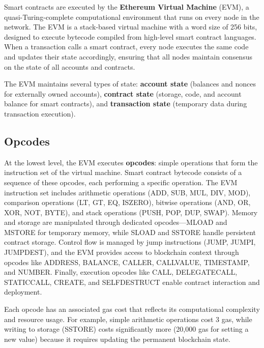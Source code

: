 Smart contracts are executed by the \textbf{Ethereum Virtual Machine} (EVM), a quasi-Turing-complete computational environment that runs on every node in the network. The EVM is a stack-based virtual machine with a word size of 256 bits, designed to execute bytecode compiled from high-level smart contract languages. When a transaction calls a smart contract, every node executes the same code and updates their state accordingly, ensuring that all nodes maintain consensus on the state of all accounts and contracts.

The EVM maintains several types of state: \textbf{account state} (balances and nonces for externally owned accounts), \textbf{contract state} (storage, code, and account balance for smart contracts), and \textbf{transaction state} (temporary data during transaction execution).

\subsection{Opcodes}
At the lowest level, the EVM executes \textbf{opcodes}: simple operations that form the instruction set of the virtual machine. Smart contract bytecode consists of a sequence of these opcodes, each performing a specific operation. The EVM instruction set includes arithmetic operations (ADD, SUB, MUL, DIV, MOD), comparison operations (LT, GT, EQ, ISZERO), bitwise operations (AND, OR, XOR, NOT, BYTE), and stack operations (PUSH, POP, DUP, SWAP). Memory and storage are manipulated through dedicated opcodes—MLOAD and MSTORE for temporary memory, while SLOAD and SSTORE handle persistent contract storage. Control flow is managed by jump instructions (JUMP, JUMPI, JUMPDEST), and the EVM provides access to blockchain context through opcodes like ADDRESS, BALANCE, CALLER, CALLVALUE, TIMESTAMP, and NUMBER. Finally, execution opcodes like CALL, DELEGATECALL, STATICCALL, CREATE, and SELFDESTRUCT enable contract interaction and deployment.

Each opcode has an associated gas cost that reflects its computational complexity and resource usage. For example, simple arithmetic operations cost 3 gas, while writing to storage (SSTORE) costs significantly more (20,000 gas for setting a new value) because it requires updating the permanent blockchain state.

